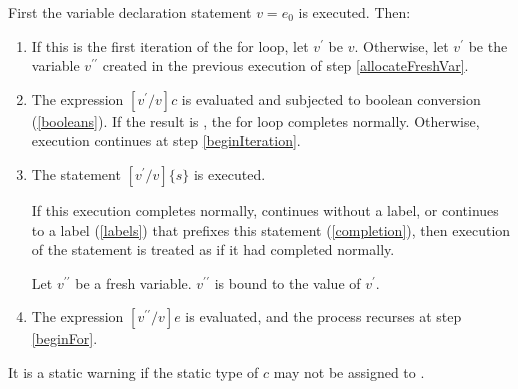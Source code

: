 \documentclass{article}
\begin{document}
\LMHash{}
First the variable declaration statement \VAR{} $v = e_0$ is executed.
Then:
\begin{enumerate}
\item
\label{beginFor}
If this is the first iteration of the for loop, let $v^\prime$ be $v$.
Otherwise, let $v^\prime$ be the variable $v^{\prime\prime}$ created in the previous execution of step \ref{allocateFreshVar}.
\item
The expression $[v^\prime/v]c$ is evaluated and subjected to boolean conversion (\ref{booleans}).
If the result is \FALSE{}, the for loop completes normally.
Otherwise, execution continues at step \ref{beginIteration}.
\item
\label{beginIteration}
The statement $[v^\prime/v]\{s\}$ is executed.

If this execution completes normally, continues without a label,
or continues to a label (\ref{labels}) that prefixes this \FOR{} statement (\ref{completion}),
then execution of the statement is treated as if it had completed normally.

\label{allocateFreshVar}
Let $v^{\prime\prime}$ be a fresh variable.
$v^{\prime\prime}$ is bound to the value of $v^\prime$.
\item
The expression $[v^{\prime\prime}/v]e$ is evaluated, and the process recurses at step \ref{beginFor}.
\end{enumerate}


\LMHash{}
It is a static warning if the static type of $c$ may not be assigned to .


\end{document}
